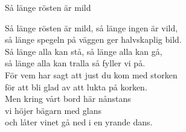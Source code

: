 \begin{song}{Så länge rösten är mild}
	
	
	
	Så länge rösten är mild, så länge ingen är vild,\\
	så länge spegeln på väggen ger halvskaplig bild.\\
	Så länge alla kan stå, så länge alla kan gå,\\
	så länge alla kan tralla så fyller vi på.\\
	För vem har sagt att just du kom med storken\\
	för att bli glad av att lukta på korken.\\
	Men kring vårt bord här nånstans\\
	vi höjer bägarn med glans\\
	och låter vinet gå ned i en yrande dans.
	
\end{song}
